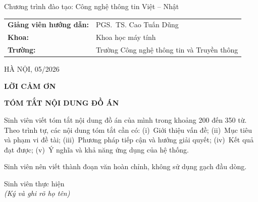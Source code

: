 ﻿\documentclass[a4paper,12pt,openany,oneside]{report}
\begin{document}
\begin{titlepage}
    {\fontsize{13pt}{16pt}\selectfont
        Chương trình đào tạo: Công nghệ thông tin Việt -- Nhật\par}

    \vspace{1.0cm}

    \begin{flushleft}
        \fontsize{12pt}{15pt}\selectfont
        \begin{tabular}{p{5.7cm}p{8.5cm}}
            \textbf{Giảng viên hướng dẫn:} & PGS.~TS. Cao Tuấn Dũng \\[4pt]
            \textbf{Khoa:}                  & Khoa học máy tính \\[4pt]
            \textbf{Trường:}                & Trường Công nghệ thông tin và Truyền thông \\
        \end{tabular}
    \end{flushleft}

    \vfill

    {\fontsize{13pt}{16pt}\selectfont
        HÀ NỘI, 05/2026\par}

\end{titlepage}

\clearpage
\thispagestyle{empty}
\begin{center}
    {\bfseries\fontsize{18pt}{22pt}\selectfont LỜI CẢM ƠN}
\end{center}
\vspace{1.5cm}


\clearpage
\thispagestyle{empty}
\begin{center}
    {\bfseries\fontsize{18pt}{22pt}\selectfont TÓM TẮT NỘI DUNG ĐỒ ÁN}
\end{center}
\vspace{1.5cm}

Sinh viên viết tóm tắt nội dung đồ án của mình trong khoảng 200 đến 350 từ.
Theo trình tự, các nội dung tóm tắt cần có:
(i)~Giới thiệu vấn đề;
(ii)~Mục tiêu và phạm vi đề tài;
(iii)~Phương pháp tiếp cận và hướng giải quyết;
(iv)~Kết quả đạt được;
(v)~Ý nghĩa và khả năng ứng dụng của hệ thống.

Sinh viên nên viết thành đoạn văn hoàn chỉnh, không sử dụng gạch đầu dòng.

\vspace{2cm}
\begin{flushright}
    Sinh viên thực hiện\\[4pt]
    {\itshape (Ký và ghi rõ họ tên)}
\end{flushright}
\end{document}
